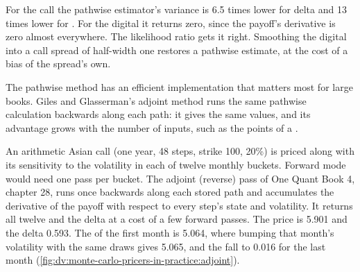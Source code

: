 For the call the pathwise estimator's variance is 6.5 times lower for delta and 13 times lower for . For the digital it returns zero, since the
payoff's derivative is zero almost everywhere. The likelihood ratio gets it right. Smoothing the digital into a call spread of half-width one restores
a pathwise estimate, at the cost of a bias of the spread's own.

The pathwise method has an efficient implementation that matters most for large books. Giles and Glasserman's adjoint method
runs the same pathwise calculation backwards along each path: it gives the same values, and its advantage grows with the number of
inputs, such as the points of a .

\begin{example}\label{ex:dv:monte-carlo-pricers-in-practice:adjoint}
An arithmetic Asian call (one year, 48 steps, strike 100, 20\%) is priced along with its sensitivity to the volatility in each of twelve monthly
buckets. Forward mode would need one pass per bucket. The adjoint (reverse) pass of One Quant Book 4, chapter 28, runs once backwards along each stored
path and accumulates the derivative of the payoff with respect to every step's state and volatility. It returns all twelve  and the delta at a
cost of a few forward passes. The price is 5.901 and the delta 0.593. The  of the first month is 5.064, where bumping that month's volatility with
the same draws gives 5.065, and the  fall to 0.016 for the last month (\cref{fig:dv:monte-carlo-pricers-in-practice:adjoint}).
\end{example}

\begin{omfigure}

\label{fig:dv:monte-carlo-pricers-in-practice:adjoint}
\end{omfigure}


